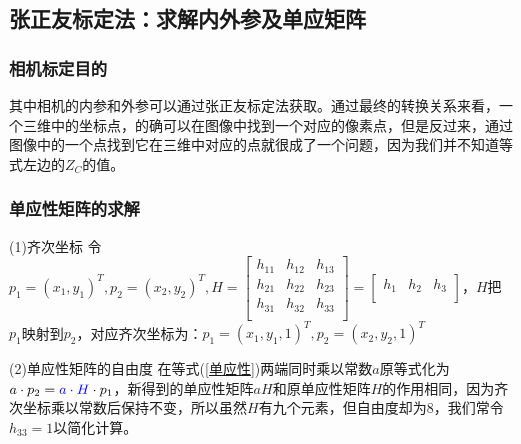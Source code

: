 \documentclass[aspectratio=43]{beamer}
\begin{document}
	\subsection{张正友标定法：求解内外参及单应矩阵}
	
	\begin{frame}
	\frametitle{相机标定目的}
	   \quad 其中相机的内参和外参可以通过张正友标定法获取。通过最终的转换关系来看，一个三维中的坐标点，的确可以在图像中找到一个对应的像素点，但是反过来，通过图像中的一个点找到它在三维中对应的点就很成了一个问题，因为我们并不知道等式左边的$Z_C$的值。
	\end{frame}
	
	
	
		\begin{frame}
		\frametitle{单应性矩阵的求解}
		\begin{block}{(1)齐次坐标}
			令$p_1=\left( x_1,y_1 \right) ^T,p_2=\left( x_2,y_2 \right) ^T,H=\left[ \begin{matrix}
				h_{11}&		h_{12}&		h_{13}\\
				h_{21}&		h_{22}&		h_{23}\\
				h_{31}&		h_{32}&		h_{33}\\
			\end{matrix} \right] =\left[ \begin{matrix}
				h_1&		h_2&		h_3\\
			\end{matrix} \right]  $，$H$把$p_1$映射到$p_2$，对应齐次坐标为：$p_1=\left( x_1,y_1,1 \right) ^T,p_2=\left( x_2,y_2,1 \right) ^T$
		\end{block}
		\begin{block}{(2)单应性矩阵的自由度}
			在等式(\ref{单应性})两端同时乘以常数$a$原等式化为$a\cdot p_2={\color{blue} a\cdot H}\cdot p_1$，新得到的单应性矩阵$aH$和原单应性矩阵$H$的作用相同，因为齐次坐标乘以常数后保持不变，所以虽然$H$有九个元素，但自由度却为8，我们常令$h_{33}=1$以简化计算。
		\end{block}
	\end{frame}
	
\end{document}
